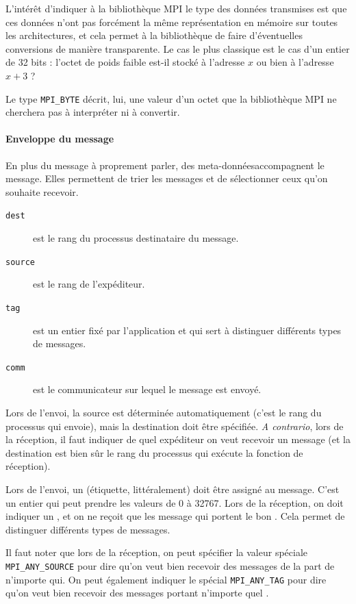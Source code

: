 L'intérêt d'indiquer à la bibliothèque MPI le type des données transmises
est que ces données n'ont pas forcément la même représentation en
mémoire sur toutes les architectures, et cela permet à la bibliothèque de
faire d'éventuelles conversions de manière transparente. Le cas le
plus classique est le cas d'un entier de 32 bits : l'octet de poids
faible est-il stocké à l'adresse $x$ ou bien à l'adresse $x+3$ ?

Le type \texttt{MPI\_BYTE} décrit, lui, une valeur d'un octet que la
bibliothèque MPI ne cherchera pas à interpréter ni à convertir.

\paragraph{Enveloppe du message} En plus du message à proprement
parler, des \og meta-données\fg accompagnent le message. Elles
permettent de trier les messages et de sélectionner ceux qu'on
souhaite recevoir.
\begin{description}
\item[\texttt{dest}] est le rang du processus destinataire du message.
\item[\texttt{source}] est le rang de l'expéditeur.
\item[\texttt{tag}] est un entier fixé par l'application et qui sert à
  distinguer différents types de messages.
\item[\texttt{comm}] est le communicateur sur lequel le message est envoyé.
\end{description}

Lors de l'envoi, la source est déterminée automatiquement (c'est le rang du
processus qui envoie), mais la destination doit être spécifiée. \textit{A
  contrario}, lors de la réception, il faut indiquer de quel expéditeur on veut
recevoir un message (et la destination est bien sûr le rang du processus qui
exécute la fonction de réception).

Lors de l'envoi, un \og {}\fg (\og étiquette\fg,
littéralement) doit être assigné au message. C'est un entier qui peut
prendre les valeurs de 0 à 32767. Lors de la réception, on doit
indiquer un , et on ne reçoit que les message qui portent
le bon . Cela permet de distinguer différents types de
messages.

Il faut noter que lors de la réception, on peut spécifier la valeur
spéciale \texttt{MPI\_ANY\_SOURCE} pour dire qu'on veut bien recevoir
des messages de la part de n'importe qui. On peut également indiquer
le  spécial \texttt{MPI\_ANY\_TAG} pour dire qu'on veut
bien recevoir des messages portant n'importe quel .

